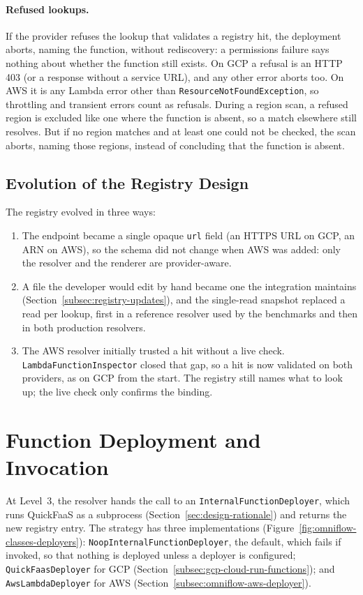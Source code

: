 \paragraph{Refused lookups.}
If the provider refuses the lookup that validates a registry hit, the deployment aborts, naming the
function, without rediscovery: a permissions failure says nothing about whether the function still
exists. On GCP a refusal is an HTTP 403 (or a response without a service URL), and any other error
aborts too. On AWS it is any Lambda error other than
\texttt{Resource\allowbreak Not\allowbreak Found\allowbreak Exception}, so throttling and transient
errors count as refusals. During a region scan, a refused region is excluded like one where the
function is absent, so a match elsewhere still resolves. But if no region matches and at least one
could not be checked, the scan aborts, naming those regions, instead of concluding that the function
is absent.

\subsection{Evolution of the Registry Design}
\label{subsec:registry-evolution}

The registry evolved in three ways:
\begin{enumerate}
  \item The endpoint became a single opaque \texttt{url} field (an HTTPS URL on GCP, an ARN on
  AWS), so the schema did not change when AWS was added: only the resolver and the renderer are
  provider-aware.
  \item A file the developer would edit by hand became one the integration maintains
  (Section~\ref{subsec:registry-updates}), and the single-read snapshot replaced a read per lookup,
  first in a reference resolver used by the benchmarks and then in both production resolvers.
  \item The AWS resolver initially trusted a hit without a live check.
  \texttt{Lambda\allowbreak Function\allowbreak Inspector} closed that gap, so a hit is now validated
  on both providers, as on GCP from the start. The registry still names what to look up; the live
  check only confirms the binding.
\end{enumerate}

\section{Function Deployment and Invocation}
\label{sec:function-deployment}
At Level~3, the resolver hands the call to an
\texttt{Internal\allowbreak Function\allowbreak Deployer}, which runs QuickFaaS as a subprocess
(Section~\ref{sec:design-rationale}) and returns the new registry entry. The strategy has three
implementations (Figure~\ref{fig:omniflow-classes-deployers}):
\texttt{Noop\allowbreak Internal\allowbreak Function\allowbreak Deployer}, the default, which fails
if invoked, so that nothing is deployed unless a deployer is configured;
\texttt{QuickFaasDeployer} for GCP (Section~\ref{subsec:gcp-cloud-run-functions}); and
\texttt{AwsLambdaDeployer} for AWS (Section~\ref{subsec:omniflow-aws-deployer}).


